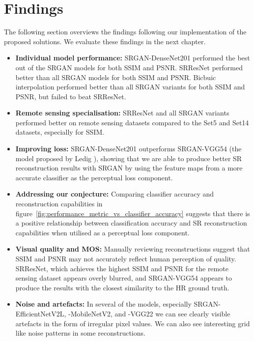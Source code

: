 \section{Findings}
The following section overviews the findings following our implementation of the proposed solutions. We evaluate these findings in the next chapter.
\begin{itemize}
    \item \textbf{Individual model performance:} SRGAN-DenseNet201 performed the best out of the SRGAN models for both SSIM and PSNR. SRResNet performed better than all SRGAN models for both SSIM and PSNR. Bicbuic interpolation performed better than all SRGAN variants for both SSIM and PSNR, but failed to beat SRResNet.
    \item \textbf{Remote sensing specialisation:} SRResNet and all SRGAN variants performed better on remote sensing datasets compared to the Set5 and Set14 datasets, especially for SSIM.
    \item \textbf{Improving loss:} SRGAN-DenseNet201 outperforms SRGAN-VGG54 (the model proposed by Ledig \etal), showing that we are able to produce better SR reconstruction results with SRGAN by using the feature maps from a more accurate classifier as the perceptual loss component.
    \item \textbf{Addressing our conjecture:} Comparing classifier accuracy and reconstruction capabilities in figure~\ref{fig:performance_metric_vs_classifier_accuracy} suggests that there is a positive relationship between classification accuracy and SR reconstruction capabilities when utilised as a perceptual loss component.
    \item \textbf{Visual quality and MOS:} Manually reviewing reconstructions suggest that SSIM and PSNR may not accurately reflect human perception of quality. SRResNet, which achieves the highest SSIM and PSNR for the remote sensing dataset appears overly blurred, and SRGAN-VGG54 appears to produce the results with the closest similarity to the HR ground truth.
    \item \textbf{Noise and artefacts:} In several of the models, especially SRGAN-EfficientNetV2L, -MobileNetV2, and -VGG22 we can see clearly visible artefacts in the form of irregular pixel values. We can also see interesting grid like noise patterns in some reconstructions.
\end{itemize}



